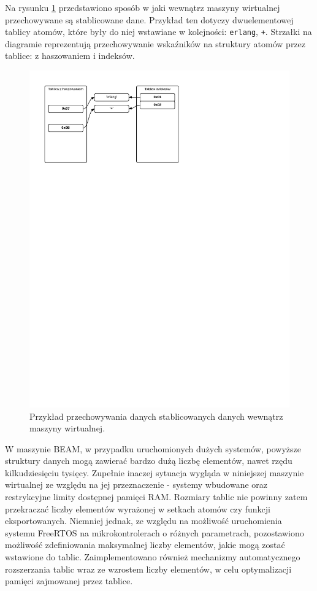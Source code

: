 Na rysunku \ref{fig:atomtable} przedstawiono sposób w jaki wewnątrz maszyny wirtualnej przechowywane są stablicowane dane.  Przykład ten dotyczy dwuelementowej tablicy atomów, które były do niej wstawiane w kolejności: \texttt{erlang}, \texttt{+}. Strzałki na diagramie reprezentują przechowywanie wskaźników na struktury atomów przez tablice: z haszowaniem i indeksów.

\begin{figure}[h]
\centerline{\includegraphics[scale=1, clip, trim=0 200mm 90mm 0]{atom_table}}
\caption{Przykład przechowywania danych stablicowanych danych wewnątrz maszyny wirtualnej.}
\label{fig:atomtable}
\end{figure}

W maszynie BEAM, w przypadku uruchomionych dużych systemów, powyższe struktury danych mogą zawierać bardzo dużą liczbę elementów, nawet rzędu kilkudziesięciu tysięcy. Zupełnie inaczej sytuacja wygląda w niniejszej maszynie wirtualnej ze względu na jej przeznaczenie - systemy wbudowane oraz restrykcyjne limity dostępnej pamięci RAM. Rozmiary tablic nie powinny zatem przekraczać liczby elementów wyrażonej w setkach atomów czy funkcji eksportowanych. Niemniej jednak, ze względu na możliwość uruchomienia systemu FreeRTOS na mikrokontrolerach o różnych parametrach, pozostawiono możliwość zdefiniowania maksymalnej liczby elementów, jakie mogą zostać wstawione do tablic. Zaimplementowano również mechanizmy automatycznego rozszerzania tablic wraz ze wzrostem liczby elementów, w celu optymalizacji pamięci zajmowanej przez tablice.

